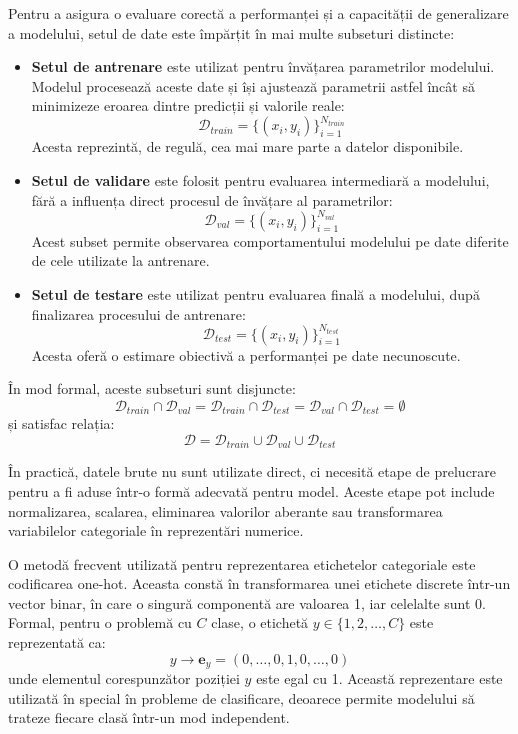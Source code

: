Pentru a asigura o evaluare corectă a performanței și a capacității de generalizare a modelului, setul de date este împărțit în mai multe subseturi distincte:

\begin{itemize}
    \item \textbf{Setul de antrenare} este utilizat pentru învățarea parametrilor modelului. Modelul procesează aceste date și își ajustează parametrii astfel încât să minimizeze eroarea dintre predicții și valorile reale:
    \[
        \mathcal{D}_{train} = \{(x_i, y_i)\}_{i=1}^{N_{train}}
    \]
    Acesta reprezintă, de regulă, cea mai mare parte a datelor disponibile.

    \item \textbf{Setul de validare} este folosit pentru evaluarea intermediară a modelului, fără a influența direct procesul de învățare al parametrilor:
    \[
        \mathcal{D}_{val} = \{(x_i, y_i)\}_{i=1}^{N_{val}}
    \]
    Acest subset permite observarea comportamentului modelului pe date diferite de cele utilizate la antrenare.

    \item \textbf{Setul de testare} este utilizat pentru evaluarea finală a modelului, după finalizarea procesului de antrenare:
    \[
        \mathcal{D}_{test} = \{(x_i, y_i)\}_{i=1}^{N_{test}}
    \]
    Acesta oferă o estimare obiectivă a performanței pe date necunoscute.
\end{itemize}

În mod formal, aceste subseturi sunt disjuncte:
\[
    \mathcal{D}_{train} \cap \mathcal{D}_{val} =
    \mathcal{D}_{train} \cap \mathcal{D}_{test} =
    \mathcal{D}_{val} \cap \mathcal{D}_{test} =
    \emptyset
\]
și satisfac relația:
\[
    \mathcal{D} = \mathcal{D}_{train} \cup \mathcal{D}_{val} \cup \mathcal{D}_{test}
\]

În practică, datele brute nu sunt utilizate direct, ci necesită etape de prelucrare pentru a fi aduse într-o formă adecvată pentru model. Aceste etape pot include normalizarea, scalarea, eliminarea valorilor aberante sau transformarea variabilelor categoriale în reprezentări numerice.

O metodă frecvent utilizată pentru reprezentarea etichetelor categoriale este codificarea one-hot. Aceasta constă în transformarea unei etichete discrete într-un vector binar, în care o singură componentă are valoarea 1, iar celelalte sunt 0. Formal, pentru o problemă cu \( C \) clase, o etichetă \( y \in \{1, 2, \ldots, C\} \) este reprezentată ca:
\[
    y \rightarrow \mathbf{e}_y = (0, \ldots, 0, 1, 0, \ldots, 0)
\]
unde elementul corespunzător poziției \( y \) este egal cu 1. Această reprezentare este utilizată în special în probleme de clasificare, deoarece permite modelului să trateze fiecare clasă într-un mod independent.

